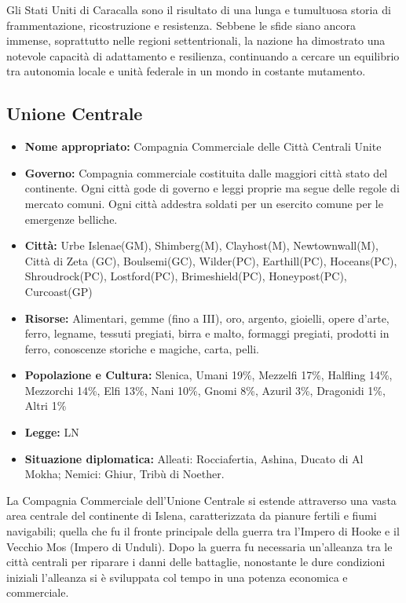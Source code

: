 \documentclass[10pt, a4paper]{report}
\begin{document}
\begin{multicols}{2}
Gli Stati Uniti di Caracalla sono il risultato di una lunga e tumultuosa storia di frammentazione, ricostruzione e resistenza. Sebbene le sfide siano ancora immense, soprattutto nelle regioni settentrionali, la nazione ha dimostrato una notevole capacità di adattamento e resilienza, continuando a cercare un equilibrio tra autonomia locale e unità federale in un mondo in costante mutamento.

\subsection*{Unione Centrale}
\begin{itemize}
	\item \textbf{Nome appropriato:} Compagnia Commerciale delle Città Centrali Unite
	\item \textbf{Governo: }Compagnia commerciale costituita dalle maggiori città stato del continente. Ogni città gode di governo e leggi proprie ma segue delle regole di mercato comuni. Ogni città addestra soldati per un esercito comune per le emergenze belliche.
	\item \textbf{Città:} Urbe Islenae(GM), Shimberg(M), Clayhost(M), Newtownwall(M), Città di Zeta (GC), Boulsemi(GC), Wilder(PC), Earthill(PC), Hoceans(PC), Shroudrock(PC), Lostford(PC), Brimeshield(PC), Honeypost(PC), Curcoast(GP)
	\item \textbf{Risorse:} Alimentari, gemme (fino a III), oro, argento, gioielli, opere d'arte, ferro, legname, tessuti pregiati, birra e malto, formaggi pregiati, prodotti in ferro, conoscenze storiche e magiche, carta, pelli.
	\item \textbf{Popolazione e Cultura:} Slenica, Umani 19\%, Mezzelfi 17\%, Halfling 14\%, Mezzorchi 14\%, Elfi 13\%, Nani 10\%, Gnomi 8\%, Azuril 3\%, Dragonidi 1\%, Altri 1\%
	\item \textbf{Legge:} LN
	\item \textbf{Situazione diplomatica:} Alleati: Rocciafertia, Ashina, Ducato di Al Mokha; Nemici: Ghiur, Tribù di Noether.
\end{itemize}
La Compagnia Commerciale dell'Unione Centrale si estende attraverso una vasta area centrale del continente di Islena, caratterizzata da pianure fertili e fiumi navigabili; quella che fu il fronte principale della guerra tra l'Impero di Hooke e il Vecchio Mos (Impero di Unduli). Dopo la guerra fu necessaria un'alleanza tra le città centrali per riparare i danni delle battaglie, nonostante le dure condizioni iniziali l'alleanza si è sviluppata col tempo in una potenza economica e commerciale.

\end{multicols}
\end{document}
